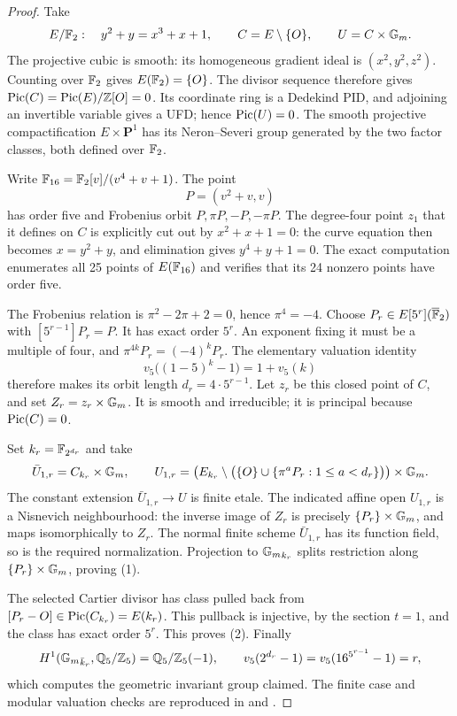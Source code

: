 \begin{proof}
Take
\[
 E/\mathbb F_2:\quad y^2+y=x^3+x+1,
 \qquad C=E\setminus\{O\},\qquad U=C\times{\mathbb G_m}.
\]
The projective cubic is smooth: its homogeneous gradient ideal is
\((x^2,y^2,z^2)\).  Counting over \(\mathbb F_2\) gives
\(E(\mathbb F_2)=\{O\}\).  The divisor sequence therefore gives
\(\operatorname{Pic}(C)=\operatorname{Pic}(E)/\mathbb Z[O]=0\).  Its coordinate ring is
a Dedekind PID, and adjoining an invertible variable gives a UFD;
hence \(\operatorname{Pic}(U)=0\).  The smooth projective compactification
\(E\times\mathbf P^1\) has its Neron--Severi group generated
by the two factor classes, both defined over \(\mathbb F_2\).

Write \(\mathbb F_{16}=\mathbb F_2[v]/(v^4+v+1)\).  The point
\[
 P=(v^2+v,v)
\]
has order five and Frobenius orbit
\(P,\pi P,-P,-\pi P\).  The degree-four point \(z_1\)
that it defines on \(C\) is explicitly cut out by
\(x^2+x+1=0\): the curve equation then becomes
\(x=y^2+y\), and elimination gives \(y^4+y+1=0\).
The exact computation enumerates all 25 points of \(E(\mathbb F_{16})\)
and verifies that its 24 nonzero points have order five.

The Frobenius relation is \(\pi^2-2\pi+2=0\), hence
\(\pi^4=-4\).  Choose \(P_r\in E[5^r](\overline{\mathbb F}_2)\)
with \([5^{r-1}]P_r=P\).  It has exact order \(5^r\).
An exponent fixing it must be a multiple of four, and
\(\pi^{4k}P_r=(-4)^kP_r\).  The elementary valuation identity
\[
 v_5\bigl((1-5)^k-1\bigr)=1+v_5(k)
\]
therefore makes its orbit length
\(d_r=4\cdot5^{r-1}\).  Let \(z_r\) be this closed point of
\(C\), and set \(Z_r=z_r\times{\mathbb G_m}\).
It is smooth and irreducible; it is principal because
\(\operatorname{Pic}(C)=0\).

Set \(k_r=\mathbb F_{2^{d_r}}\) and take
\[
 \bar U_{1,r}=C_{k_r}\times{\mathbb G_m},\qquad
 U_{1,r}=
 \left(E_{k_r}\setminus
 \bigl(\{O\}\cup\{\pi^aP_r:1\leq a<d_r\}\bigr)\right)
 \times{\mathbb G_m}.
\]
The constant extension \(\bar U_{1,r}\to U\) is finite etale.
The indicated affine open \(U_{1,r}\) is a Nisnevich neighbourhood:
the inverse image of \(Z_r\) is precisely
\(\{P_r\}\times{\mathbb G_m}\), and maps isomorphically to \(Z_r\).
The normal finite scheme \(\bar U_{1,r}\) has its function field,
so is the required normalization.
Projection to \({\mathbb G_m}_{k_r}\) splits restriction along
\(\{P_r\}\times{\mathbb G_m}\), proving (1).

The selected Cartier divisor has class pulled back from
\([P_r-O]\in\operatorname{Pic}(C_{k_r})=E(k_r)\).
This pullback is injective, by the section \(t=1\), and the class
has exact order \(5^r\).  This proves (2).  Finally
\[
 H^1({\mathbb G_m}_{\bar k_r},\mathbb Q_5/\mathbb Z_5)
       =\mathbb Q_5/\mathbb Z_5(-1),\qquad
 v_5(2^{d_r}-1)=v_5(16^{5^{r-1}}-1)=r,
\]
which computes the geometric invariant group claimed.
The finite case and modular valuation checks are reproduced in
 and
.
\end{proof}

